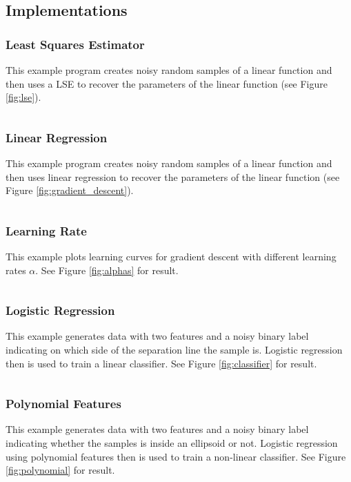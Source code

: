 \documentclass[a4paper,twoside,10pt]{article}
\begin{document}
\subsection{Implementations}
\subsubsection{Least Squares Estimator}\label{app:lse}
This example program creates noisy random samples of a linear function and then uses a \ac{LSE} to recover the parameters of the linear function (see Figure \ref{fig:lse}).
\inputminted[frame=lines,linenos,fontsize=\small]{python}{least_squares.py}

\subsubsection{Linear Regression}\label{app:gradientdescent}
This example program creates noisy random samples of a linear function and then uses linear regression to recover the parameters of the linear function (see Figure \ref{fig:gradient_descent}).
\inputminted[frame=lines,linenos,fontsize=\small]{python}{gradient_descent.py}

\subsubsection{Learning Rate}\label{app:alphas}
This example plots learning curves for gradient descent with different learning rates $\alpha$. See Figure \ref{fig:alphas} for result.
\inputminted[frame=lines,linenos,fontsize=\small]{python}{learning_rate.py}

\subsubsection{Logistic Regression}\label{app:classifier}
This example generates data with two features and a noisy binary label indicating on which side of the separation line the sample is.
Logistic regression then is used to train a linear classifier.
See Figure \ref{fig:classifier} for result.
\inputminted[frame=lines,linenos,fontsize=\small]{python}{classifier.py}

\subsubsection{Polynomial Features}\label{app:polynomial}
This example generates data with two features and a noisy binary label indicating whether the samples is inside an ellipsoid or not.
Logistic regression using polynomial features then is used to train a non-linear classifier.
See Figure \ref{fig:polynomial} for result.
\inputminted[frame=lines,linenos,fontsize=\small]{python}{polynomial.py}
\end{document}
